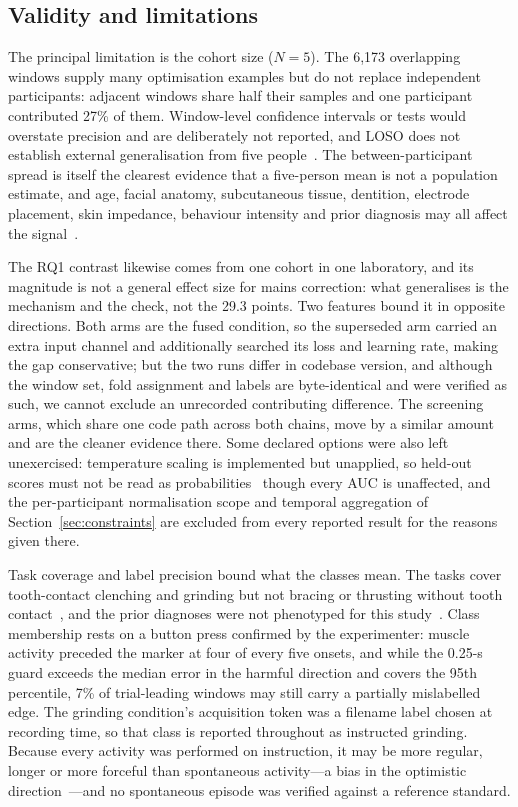 \documentclass[pdflatex,sn-nature,iicol]{sn-jnl}
\begin{document}
\subsection{Validity and limitations}

The principal limitation is the cohort size ($N=5$). The 6,173 overlapping windows supply many optimisation examples but do not replace independent participants: adjacent windows share half their samples and one participant contributed 27\% of them. Window-level confidence intervals or tests would overstate precision and are deliberately not reported, and LOSO does not establish external generalisation from five people~\cite{varoquaux2018cross}. The between-participant spread is itself the clearest evidence that a five-person mean is not a population estimate, and age, facial anatomy, subcutaneous tissue, dentition, electrode placement, skin impedance, behaviour intensity and prior diagnosis may all affect the signal~\cite{besomi2019consensus,hermens2000development}.

The RQ1 contrast likewise comes from one cohort in one laboratory, and its magnitude is not a general effect size for mains correction: what generalises is the mechanism and the check, not the 29.3 points. Two features bound it in opposite directions. Both arms are the fused condition, so the superseded arm carried an extra input channel and additionally searched its loss and learning rate, making the gap conservative; but the two runs differ in codebase version, and although the window set, fold assignment and labels are byte-identical and were verified as such, we cannot exclude an unrecorded contributing difference. The screening arms, which share one code path across both chains, move by a similar amount and are the cleaner evidence there. Some declared options were also left unexercised: temperature scaling is implemented but unapplied, so held-out scores must not be read as probabilities~\cite{guo2017calibration} though every AUC is unaffected, and the per-participant normalisation scope and temporal aggregation of Section~\ref{sec:constraints} are excluded from every reported result for the reasons given there.

Task coverage and label precision bound what the classes mean. The tasks cover tooth-contact clenching and grinding but not bracing or thrusting without tooth contact~\cite{verhoeff2025definitions}, and the prior diagnoses were not phenotyped for this study~\cite{manfredini2024standardised}. Class membership rests on a button press confirmed by the experimenter: muscle activity preceded the marker at four of every five onsets, and while the 0.25-s guard exceeds the median error in the harmful direction and covers the 95th percentile, 7\% of trial-leading windows may still carry a partially mislabelled edge. The grinding condition's acquisition token was a filename label chosen at recording time, so that class is reported throughout as instructed grinding. Because every activity was performed on instruction, it may be more regular, longer or more forceful than spontaneous activity---a bias in the optimistic direction~\cite{farella2008masticatory}---and no spontaneous episode was verified against a reference standard.
\end{document}
